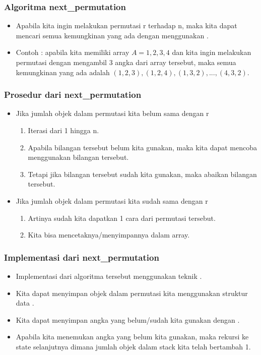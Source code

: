 \begin{frame}
\frametitle{Algoritma next\_permutation}
\begin{itemize}
  \item Apabila kita ingin melakukan permutasi r terhadap n, maka kita dapat mencari semua kemungkinan yang ada dengan menggunakan .
  \item Contoh : apabila kita memiliki array $A={1,2,3,4}$ dan kita ingin melakukan permutasi dengan mengambil 3 angka dari array tersebut, maka semua kemungkinan yang ada adalah $(1,2,3), (1,2,4), (1,3,2), ..., (4,3,2)$.
\end{itemize}
\end{frame}

\begin{frame}
\frametitle{Prosedur dari next\_permutation}
\begin{itemize}
  \item Jika jumlah objek dalam permutasi kita belum sama dengan r
  \begin{enumerate}
    \item Iterasi dari 1 hingga n.
    \item Apabila bilangan tersebut belum kita gunakan, maka kita dapat mencoba menggunakan bilangan tersebut.
    \item Tetapi jika bilangan tersebut sudah kita gunakan, maka abaikan bilangan tersebut.
  \end{enumerate}
  \item Jika jumlah objek dalam permutasi kita sudah sama dengan r
  \begin{enumerate}
    \item Artinya sudah kita dapatkan 1 cara dari permutasi tersebut.
    \item Kita bisa mencetaknya/menyimpannya dalam array.
  \end{enumerate}
\end{itemize}
\end{frame}

\begin{frame}
\frametitle{Implementasi dari next\_permutation}
\begin{itemize}
  \item Implementasi dari algoritma tersebut menggunakan teknik .
  \item Kita dapat menyimpan objek dalam permutasi kita menggunakan struktur data .
  \item Kita dapat menyimpan angka yang belum/sudah kita gunakan dengan .
  \item Apabila kita menemukan angka yang belum kita gunakan, maka rekursi ke state selanjutnya dimana jumlah objek dalam stack kita telah bertambah 1.
\end{itemize}
\end{frame}

